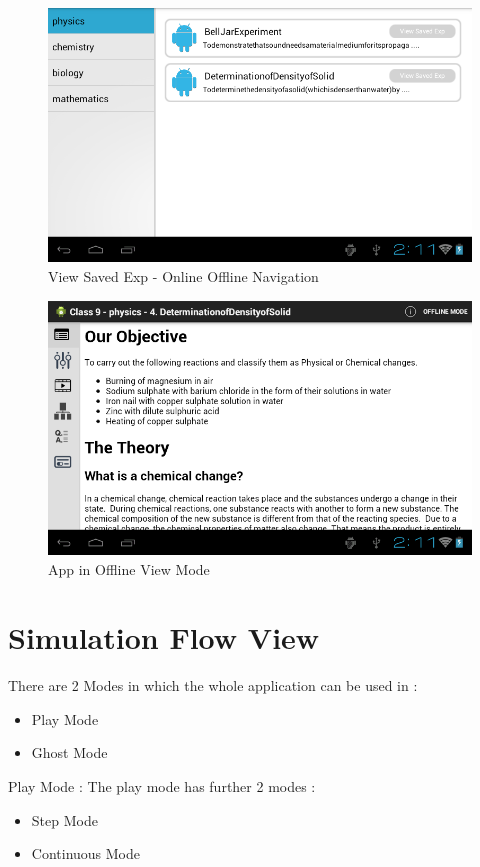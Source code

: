\documentclass[12pt]{report}
\begin{document}
\begin{figure}[H]
 \centering
 \includegraphics[width=15cm]{./37_1.png}
 \caption{View Saved Exp - Online Offline Navigation \label{fig:37_1}}
\end{figure}



\begin{figure}[H]
 \centering
 \includegraphics[width=15cm]{./40.png}
 \caption{App in Offline View Mode\label{fig:40}}
\end{figure}

\pagebreak

\section{Simulation Flow View}

There are 2 Modes in which the whole application can be used in :
\begin{itemize}
\item Play Mode 
\item Ghost Mode 
\end{itemize}
Play Mode :  
The play mode has further 2 modes :  
\begin{itemize}
\item Step Mode 
\item Continuous Mode 
\end{itemize}
\end{document}

